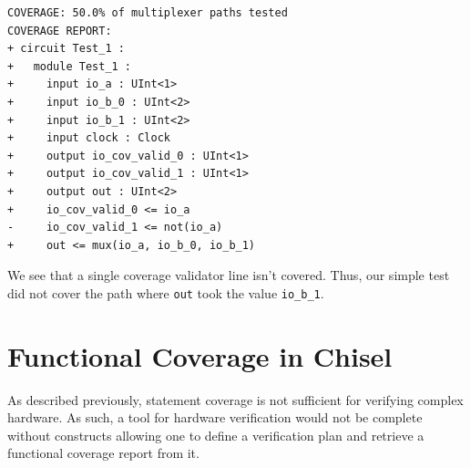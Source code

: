 \documentclass[conference]{IEEEtran}
\newcommand{\martin}[1]{{\color{blue} Martin: #1}}
\begin{document}
\begin{verbatim}
COVERAGE: 50.0% of multiplexer paths tested
COVERAGE REPORT:
+ circuit Test_1 :
+   module Test_1 :
+     input io_a : UInt<1>
+     input io_b_0 : UInt<2>
+     input io_b_1 : UInt<2>
+     input clock : Clock
+     output io_cov_valid_0 : UInt<1>
+     output io_cov_valid_1 : UInt<1>
+     output out : UInt<2>
+     io_cov_valid_0 <= io_a
-     io_cov_valid_1 <= not(io_a)
+     out <= mux(io_a, io_b_0, io_b_1)
\end{verbatim}
We see that a single coverage validator line isn't covered. Thus, our simple test did not cover the path where \texttt{out} took the value \texttt{io\_b\_1}.



\section{Functional Coverage in Chisel}
As described previously, statement coverage is not sufficient for verifying complex hardware. As such, a tool for hardware verification would not be complete without constructs allowing one to define a verification plan and retrieve a functional coverage report from it. %
\end{document}
